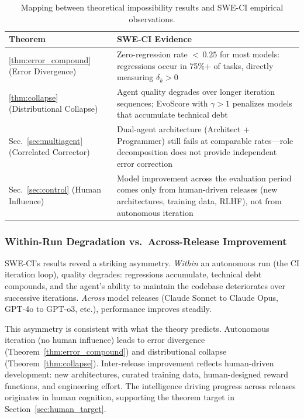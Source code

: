 \documentclass[11pt,a4paper]{article}
\newcommand{\toprule}{\hline}
\newcommand{\midrule}{\hline}
\newcommand{\bottomrule}{\hline}
\begin{document}
\begin{table}[h]
\centering
\begin{tabular}{@{}lp{9.5cm}@{}}
\toprule
\textbf{Theorem} & \textbf{SWE-CI Evidence} \\
\midrule
\ref{thm:error_compound} (Error Divergence) & Zero-regression rate ${<}\,0.25$ for most models: regressions occur in 75\%+ of tasks, directly measuring $\delta_k > 0$ \\[4pt]
\ref{thm:collapse} (Distributional Collapse) & Agent quality degrades over longer iteration sequences; EvoScore with $\gamma > 1$ penalizes models that accumulate technical debt \\[4pt]
Sec.~\ref{sec:multiagent} (Correlated Corrector) & Dual-agent architecture (Architect + Programmer) still fails at comparable rates---role decomposition does not provide independent error correction \\[4pt]
Sec.~\ref{sec:control} (Human Influence) & Model improvement across the evaluation period comes only from human-driven releases (new architectures, training data, RLHF), not from autonomous iteration \\
\bottomrule
\end{tabular}
\caption{Mapping between theoretical impossibility results and SWE-CI empirical observations.}
\label{tab:sweci}
\end{table}

\subsubsection{Within-Run Degradation vs.\ Across-Release Improvement}

SWE-CI's results reveal a striking asymmetry. \emph{Within} an autonomous run (the CI iteration loop), quality degrades: regressions accumulate, technical debt compounds, and the agent's ability to maintain the codebase deteriorates over successive iterations. \emph{Across} model releases (Claude Sonnet to Claude Opus, GPT-4o to GPT-o3, etc.), performance improves steadily.

This asymmetry is consistent with what the theory predicts. Autonomous iteration (no human influence) leads to error divergence (Theorem~\ref{thm:error_compound}) and distributional collapse (Theorem~\ref{thm:collapse}). Inter-release improvement reflects human-driven development: new architectures, curated training data, human-designed reward functions, and engineering effort. The intelligence driving progress across releases originates in human cognition, supporting the theorem target in Section~\ref{sec:human_target}.
\end{document}
